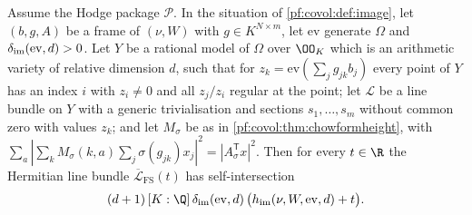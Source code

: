 \begin{proposition}\label{pf:covol:prop:vol}
Assume the Hodge package $\mathcal P$. In the situation of \cref{pf:covol:def:image}, let $(b,g,A)$ be a
frame of $(\nu,W)$ with $g\in K^{N\times m}$, let $\mathrm{ev}$ generate $\Omega$ and
$\delta_{\mathrm{im}}(\mathrm{ev},d)>0$. Let $Y$ be a rational model of $\Omega$ over $\OO_K$ which is an arithmetic
variety of relative dimension $d$, such that for $z_k=\mathrm{ev}(\sum_jg_{jk}b_j)$ every point of $Y$ has
an index $i$ with $z_i\ne0$ and all $z_j/z_i$ regular at the point; let $\mathcal L$ be a line bundle on
$Y$ with a generic trivialisation and sections $s_1,\dots,s_m$ without common zero with values $z_k$; and
let $M_\sigma$ be as in \cref{pf:covol:thm:chowformheight}, with
$\sum_a|\sum_kM_\sigma(k,a)\sum_j\sigma(g_{jk})x_j|^2=|A_\sigma^{\mathsf T}x|^2$. Then for every $t\in\R$
the Hermitian line bundle $\overline{\mathcal L}_{\mathrm{FS}}(t)$ has self-intersection
\[
(d+1)\,[K:\Q]\,\covolImDeg(\mathrm{ev},d)\,\bigl(\covolImHt(\nu,W,\mathrm{ev},d)+t\bigr).
\]
\end{proposition}

